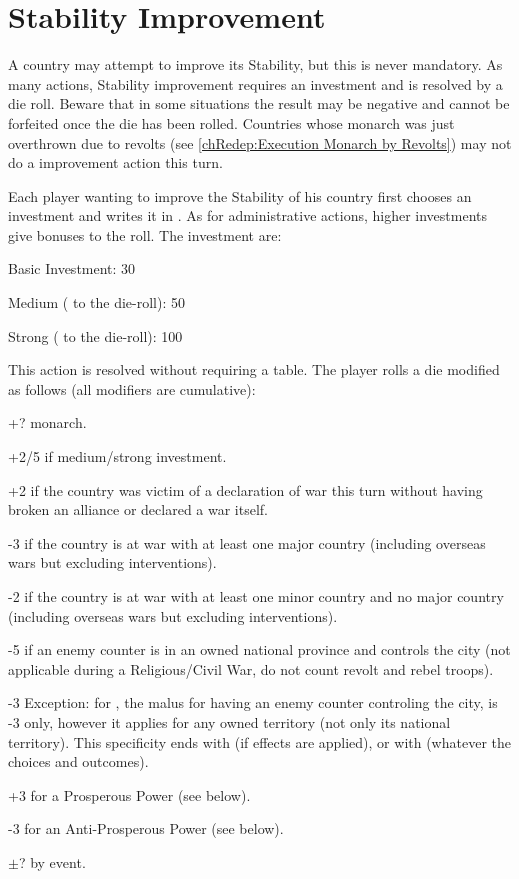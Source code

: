 \section{Stability Improvement}\label{chPeace:Stability Improvement}

\label{chPeace:Stability Improvement}
\aparag[Stability] A country may attempt to improve its Stability, but this is
never mandatory. As many actions, Stability improvement requires an investment
and is resolved by a die roll. Beware that in some situations the result may
be negative and cannot be forfeited once the die has been rolled.
\bparag Countries whose monarch was just overthrown due to revolts (see
\ref{chRedep:Execution Monarch by Revolts}) may not do a \STAB improvement
action this turn.

\aparag[Investment] Each player wanting to improve the Stability of his
country first chooses an investment and writes it in . As for administrative actions, higher investments give bonuses
to the roll.
\bparag The investment are:
\begin{modlist}
  \item Basic Investment: 30 \ducats
  \item Medium ( to the die-roll): 50 \ducats
  \item Strong ( to the die-roll): 100 \ducats
\end{modlist}

\aparag[Procedure]
This action is resolved without requiring a table.  The player rolls a die
modified as follows (all modifiers are cumulative):
\begin{modlist}
  \item[+?] \ADM monarch.
  \item[+2/5] if medium/strong investment.
  \item[+2] if the country was victim of a declaration of war this turn
    without having broken an alliance or declared a war itself.
  \item[-3] if the country is at war with at least one major country
    (including overseas wars but excluding interventions).
  \item[-2] if the country is at war with at least one minor country and no
    major country (including overseas wars but excluding interventions).
  \item[-5] if an enemy \ARMY counter is in an owned national province and
    controls the city (not applicable during a Religious/Civil War, do not
    count revolt and rebel troops).
  \item[-3] Exception: for \SPA, the malus for having an enemy \ARMY counter
    controling the city, is -3 only, however it applies for any owned
    territory (not only its national territory). This specificity ends with
     (if effects are applied), or with
     (whatever the choices and outcomes).
  \item[+3] for a Prosperous Power (see below).
  \item[-3] for an Anti-Prosperous Power (see below).
  \item[$\pm$?] by event.
\end{modlist}

